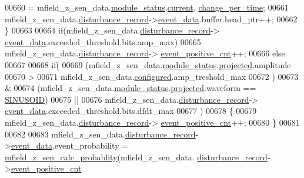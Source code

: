 \begin{DoxyCode}
00660                     = mfield\_z\_sen\_data.\hyperlink{a00027_adfab5a5d8b45a93dfb13edb24e2b80e3}{module\_status}.\hyperlink{a00019_acf41ffc11da291c2f9f0fcb02ee72b98}{current}.
      \hyperlink{a00019_a0f645dd76b41adc6a966feba8e4bff8c}{change\_per\_time};
00661             mfield\_z\_sen\_data.\hyperlink{a00027_ac9b38e2c1d3f1013a88d33506c754152}{disturbance\_record}->\hyperlink{a00028_a8c0bda69e71ef674e60da47ad0be9ab0}{event\_data}.buffer.head\_ptr++;
00662             \}
00663 
00664             \textcolor{keywordflow}{if}(mfield\_z\_sen\_data.\hyperlink{a00027_ac9b38e2c1d3f1013a88d33506c754152}{disturbance\_record}->
      \hyperlink{a00028_a8c0bda69e71ef674e60da47ad0be9ab0}{event\_data}.exceeded\_threshold.bits.amp\_max)
00665                  mfield\_z\_sen\_data.\hyperlink{a00027_ac9b38e2c1d3f1013a88d33506c754152}{disturbance\_record}->
      \hyperlink{a00028_a7397b9d76d4b57500f27bb23d258a18a}{event\_positive\_cnt}++;
00666             \textcolor{keywordflow}{else}
00667 
00668               \textcolor{keywordflow}{if}(
00669                  (mfield\_z\_sen\_data.\hyperlink{a00027_adfab5a5d8b45a93dfb13edb24e2b80e3}{module\_status}.\hyperlink{a00019_af2267fb093fb5dcaa006a570a6da3b6b}{projected}.amplitude
00670                  >
00671                   mfield\_z\_sen\_data.\hyperlink{a00027_a94b2d1f6ea4ab334c74d24984dd27843}{configured}.amp\_treshold\_max
00672                  )
00673                  &
00674                  (mfield\_z\_sen\_data.\hyperlink{a00027_adfab5a5d8b45a93dfb13edb24e2b80e3}{module\_status}.\hyperlink{a00019_af2267fb093fb5dcaa006a570a6da3b6b}{projected}.waveform == 
      \hyperlink{a00019_a8956b2c85796334b2f0617ebd3cf9a52}{SINUSOID})
00675                  ||
00676                  mfield\_z\_sen\_data.\hyperlink{a00027_ac9b38e2c1d3f1013a88d33506c754152}{disturbance\_record}->
      \hyperlink{a00028_a8c0bda69e71ef674e60da47ad0be9ab0}{event\_data}.exceeded\_threshold.bits.dfdt\_max
00677                  )
00678               \{
00679                     mfield\_z\_sen\_data.\hyperlink{a00027_ac9b38e2c1d3f1013a88d33506c754152}{disturbance\_record}->
      \hyperlink{a00028_a7397b9d76d4b57500f27bb23d258a18a}{event\_positive\_cnt}++;
00680               \}
00681 
00682 
00683              mfield\_z\_sen\_data.\hyperlink{a00027_ac9b38e2c1d3f1013a88d33506c754152}{disturbance\_record}->\hyperlink{a00028_a8c0bda69e71ef674e60da47ad0be9ab0}{event\_data}.event\_probability
       = \hyperlink{a00053_a8a5c3986dbe778d199b6e3b485f7a34b}{mfield\_z\_sen\_calc\_probablity}(mfield\_z\_sen\_data.
      \hyperlink{a00027_ac9b38e2c1d3f1013a88d33506c754152}{disturbance\_record}->\hyperlink{a00028_a7397b9d76d4b57500f27bb23d258a18a}{event\_positive\_cnt}

\end{DoxyCode}

